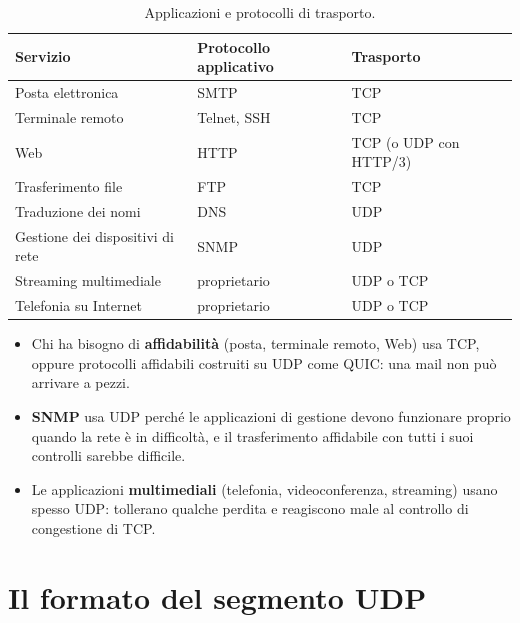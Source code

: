 \begin{table}[H]
\centering
\begin{tabular}{lll}
\toprule
\textbf{Servizio} & \textbf{Protocollo applicativo} & \textbf{Trasporto} \\
\midrule
Posta elettronica & SMTP & TCP \\
Terminale remoto & Telnet, SSH & TCP \\
Web & HTTP & TCP (o UDP con HTTP/3) \\
Trasferimento file & FTP & TCP \\
Traduzione dei nomi & DNS & UDP \\
Gestione dei dispositivi di rete & SNMP & UDP \\
Streaming multimediale & proprietario & UDP o TCP \\
Telefonia su Internet & proprietario & UDP o TCP \\
\bottomrule
\end{tabular}
\caption{Applicazioni e protocolli di trasporto.}
\end{table}

\begin{itemize}
    \item Chi ha bisogno di \textbf{affidabilità} (posta, terminale remoto, Web) usa TCP, oppure protocolli
          affidabili costruiti su UDP come QUIC: una mail non può arrivare a pezzi.
    \item \textbf{SNMP} usa UDP perché le applicazioni di gestione devono funzionare proprio quando la rete è in
          difficoltà, e il trasferimento affidabile con tutti i suoi controlli sarebbe difficile.
    \item Le applicazioni \textbf{multimediali} (telefonia, videoconferenza, streaming) usano spesso UDP: tollerano
          qualche perdita e reagiscono male al controllo di congestione di TCP.
\end{itemize}


\section{Il formato del segmento UDP}

